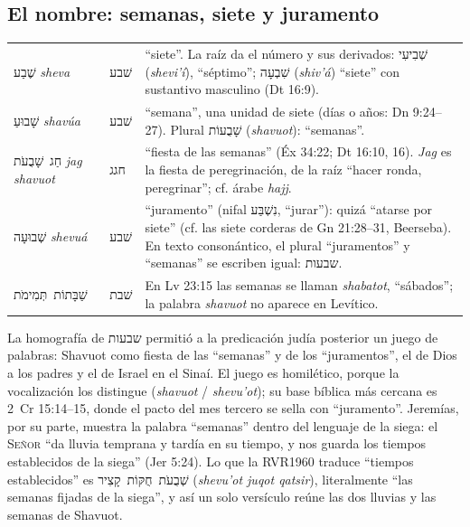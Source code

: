 \documentclass[11pt,letterpaper]{article}
\newcommand{\heb}[1]{\mbox{\foreignlanguage{hebrew}{#1}}}
\newcommand{\SENOR}{\textsc{Señor}}
\begin{document}
\subsection{El nombre: semanas, siete y juramento}

\begin{filologia}
\begin{tabular}{@{}L{3.3cm}L{1.5cm}L{9.85cm}@{}}
\heb{שֶׁבַע} \emph{sheva} & \heb{שׁבע} & ``siete''. La raíz da el número y sus derivados: \heb{שְׁבִיעִי} (\emph{shevi'í}), ``séptimo''; \heb{שִׁבְעָה} (\emph{shiv'á}) ``siete'' con sustantivo masculino (Dt 16:9). \\[2pt]
\heb{שָׁבוּעַ} \emph{shavúa} & \heb{שׁבע} & ``semana'', una unidad de siete (días o años: Dn 9:24--27). Plural \heb{שָׁבֻעוֹת} (\emph{shavuot}): ``semanas''. \\[2pt]
\heb{חַג שָׁבֻעֹת} \emph{jag shavuot} & \heb{חגג} & ``fiesta de las semanas'' (Éx 34:22; Dt 16:10, 16). \emph{Jag} es la fiesta de peregrinación, de la raíz ``hacer ronda, peregrinar''; cf. árabe \emph{hajj}. \\[2pt]
\heb{שְׁבוּעָה} \emph{shevuá} & \heb{שׁבע} & ``juramento'' (nifal \heb{נִשְׁבַּע}, ``jurar''): quizá ``atarse por siete'' (cf. las siete corderas de Gn 21:28--31, Beerseba). En texto consonántico, el plural ``juramentos'' y ``semanas'' se escriben igual: \heb{שבעות}. \\[2pt]
\heb{שַׁבָּתוֹת תְּמִימֹת} & \heb{שׁבת} & En Lv 23:15 las semanas se llaman \emph{shabatot}, ``sábados''; la palabra \emph{shavuot} no aparece en Levítico. \\
\end{tabular}
\end{filologia}

La homografía de \heb{שבעות} permitió a la predicación judía posterior un juego de palabras: Shavuot como fiesta de las ``semanas'' y de los ``juramentos'', el de Dios a los padres y el de Israel en el Sinaí. El juego es homilético, porque la vocalización los distingue (\emph{shavuot} / \emph{shevu'ot}); su base bíblica más cercana es 2~Cr 15:14--15, donde el pacto del mes tercero se sella con ``juramento''. Jeremías, por su parte, muestra la palabra ``semanas'' dentro del lenguaje de la siega: el \SENOR{} ``da lluvia temprana y tardía en su tiempo, y nos guarda los tiempos establecidos de la siega'' (Jer 5:24). Lo que la RVR1960 traduce ``tiempos establecidos'' es \heb{שְׁבֻעֹת חֻקּוֹת קָצִיר} (\emph{shevu'ot juqot qatsir}), literalmente ``las semanas fijadas de la siega'', y así un solo versículo reúne las dos lluvias y las semanas de Shavuot.
\end{document}
